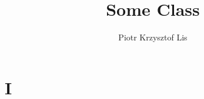 \documentclass{report}
\title{\Huge{Some Class}}
\author{\huge{ Piotr Krzysztof Lis}}
\date{}
\begin{document}
\maketitle
\newpage
{}
\renewcommand*\contentsname{Spis treści}
\renewcommand{\figurename}{Schemat}
\tableofcontents
\pagebreak

\setcounter{chapter}{1}
\chapter*{I}
\end{document}
